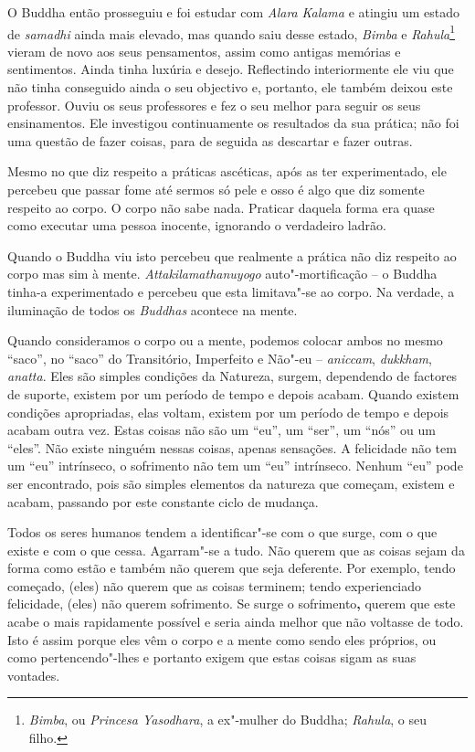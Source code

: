 O Buddha então prosseguiu e foi estudar com \emph{Alara} \emph{Kalama} e
atingiu um estado de \emph{samadhi} ainda mais elevado, mas quando saiu
desse estado, \emph{Bimba} e \emph{Rahula}\footnote{%
  \emph{Bimba}, ou \emph{Princesa Yasodhara}, a ex"-mulher do
  Buddha; \emph{Rahula}, o seu filho.
}
vieram de novo aos seus
pensamentos, assim como antigas memórias e sentimentos. Ainda tinha
luxúria e desejo. Reflectindo interiormente ele viu que não tinha
conseguido ainda o seu objectivo e, portanto, ele também deixou este
professor. Ouviu os seus professores e fez o seu melhor para seguir os
seus ensinamentos. Ele investigou continuamente os resultados da sua
prática; não foi uma questão de fazer coisas, para de seguida as
descartar e fazer outras.

Mesmo no que diz respeito a práticas ascéticas, após as ter
experimentado, ele percebeu que passar fome até sermos só pele e osso é
algo que diz somente respeito ao corpo. O corpo não sabe nada. Praticar
daquela forma era quase como executar uma pessoa inocente, ignorando o
verdadeiro ladrão.

Quando o Buddha viu isto percebeu que realmente a prática não diz
respeito ao corpo mas sim à mente. \emph{Attakilamathanuyogo}
auto"-mortificação -- o Buddha tinha-a experimentado e percebeu que esta
limitava"-se ao corpo. Na verdade, a iluminação de todos os
\emph{Buddhas} acontece na mente.

Quando consideramos o corpo ou a mente, podemos colocar ambos no mesmo
``saco'', no ``saco'' do Transitório, Imperfeito e Não"-eu --
\emph{aniccam}, \emph{dukkham}, \emph{anatta}. Eles são simples
condições da Natureza, surgem, dependendo de factores de suporte,
existem por um período de tempo e depois acabam. Quando existem
condições apropriadas, elas voltam, existem por um período de tempo e
depois acabam outra vez. Estas coisas não são um ``eu'', um ``ser'', um
``nós'' ou um ``eles''. Não existe ninguém nessas coisas, apenas
sensações. A felicidade não tem um ``eu'' intrínseco, o sofrimento não
tem um ``eu'' intrínseco. Nenhum ``eu'' pode ser encontrado, pois são
simples elementos da natureza que começam, existem e acabam, passando
por este constante ciclo de mudança.

Todos os seres humanos tendem a identificar"-se com o que surge, com o
que existe e com o que cessa. Agarram"-se a tudo. Não querem que as
coisas sejam da forma como estão e também não querem que seja deferente.
Por exemplo, tendo começado, (eles) não querem que as coisas terminem;
tendo experienciado felicidade, (eles) não querem sofrimento. Se surge o
sofrimento\textbf{,} querem que este acabe o mais rapidamente possível e
seria ainda melhor que não voltasse de todo. Isto é assim porque eles
vêm o corpo e a mente como sendo eles próprios, ou como pertencendo"-lhes
e portanto exigem que estas coisas sigam as suas vontades.

